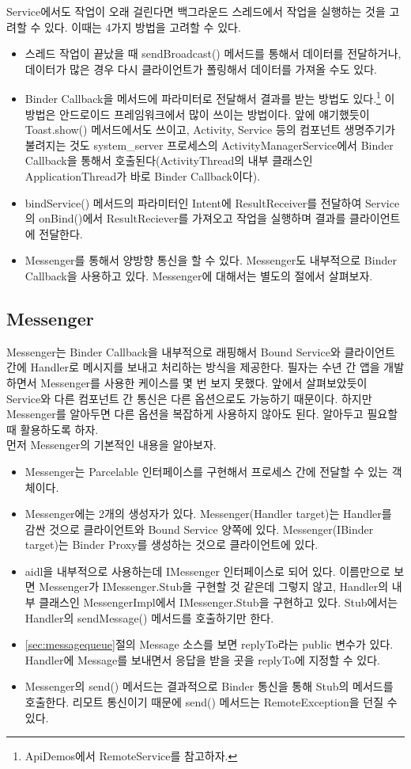 Service에서도 작업이 오래 걸린다면 백그라운드 스레드에서 작업을 실행하는 것을 고려할 수 있다. 이때는 4가지 방법을 고려할 수 있다.
\begin{itemize}
\item 스레드 작업이 끝났을 때 sendBroadcast() 메서드를 통해서 데이터를 전달하거나, 데이터가 많은 경우 다시 클라이언트가 폴링해서 데이터를 가져올 수도 있다.
\item Binder Callback을 메서드에 파라미터로 전달해서 결과를 받는 방법도 있다.\footnote{ApiDemos에서 RemoteService를 참고하자.} 이 방법은 안드로이드 프레임워크에서 많이 쓰이는 방법이다. 앞에 얘기했듯이 Toast.show() 메서드에서도 쓰이고, Activity, Service 등의 컴포넌트 생명주기가 불려지는 것도 system\_server 프로세스의 ActivityManagerService에서 Binder Callback을 통해서 호출된다(ActivityThread의 내부 클래스인 ApplicationThread가 바로 Binder Callback이다).
\item bindService() 메서드의 파라미터인 Intent에 ResultReceiver를 전달하여 Service의 onBind()에서 ResultReciever를 가져오고 작업을 실행하며 결과를 클라이언트에 전달한다.
\item Messenger를 통해서 양방향 통신을 할 수 있다. Messenger도 내부적으로 Binder Callback을 사용하고 있다. Messenger에 대해서는 별도의 절에서 살펴보자.
\end{itemize}

\subsection{Messenger}
\label{subsec:messenger}
Messenger는 Binder Callback을 내부적으로 래핑해서 Bound Service와 클라이언트 간에 Handler로 메시지를 보내고 처리하는 방식을 제공한다.
필자는 수년 간 앱을 개발하면서 Messenger를 사용한 케이스를 몇 번 보지 못했다. 
앞에서 살펴보았듯이 Service와 다른 컴포넌트 간 통신은 다른 옵션으로도 가능하기 때문이다. 
하지만 Messenger를 알아두면 다른 옵션을 복잡하게 사용하지 않아도 된다. 알아두고 필요할 때 활용하도록 하자.\\

먼저 Messenger의 기본적인 내용을 알아보자. 
\begin{itemize}
\item Messenger는 Parcelable 인터페이스를 구현해서 프로세스 간에 전달할 수 있는 객체이다.
\item Messenger에는 2개의 생성자가 있다. Messenger(Handler target)는 Handler를 감싼 것으로 클라이언트와 Bound Service 양쪽에 있다. Messenger(IBinder target)는 Binder Proxy를 생성하는 것으로 클라이언트에 있다.
\item aidl을 내부적으로 사용하는데 IMessenger 인터페이스로 되어 있다. 
이름만으로 보면 Messenger가 IMessenger.Stub을 구현할 것 같은데 그렇지 않고, Handler의 내부 클래스인 MessengerImpl에서 IMessenger.Stub을 구현하고 있다. Stub에서는 Handler의 sendMessage() 메서드를 호출하기만 한다.
\item \ref{sec:messagequeue}절의 Message 소스를 보면 replyTo라는 public 변수가 있다. Handler에 Message를 보내면서 응답을 받을 곳을 replyTo에 지정할 수 있다.
\item Messenger의 send() 메서드는 결과적으로 Binder 통신을 통해 Stub의 메서드를 호출한다. 리모트 통신이기 때문에 send() 메서드는 RemoteException을 던질 수 있다. 
\end{itemize}

